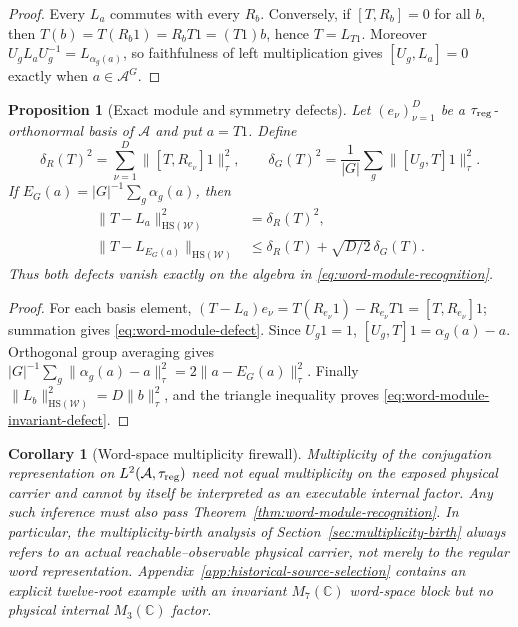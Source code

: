 \documentclass[11pt]{article}
\newtheorem{proposition}[theorem]{Proposition}
\newtheorem{corollary}[theorem]{Corollary}
\theoremstyle{definition}
\theoremstyle{remark}
\newcommand{\C}{\mathbb C}
\newcommand{\HS}{\mathrm{HS}}
\newcommand{\norm}[1]{\lVert#1\rVert}
\newcommand{\A}{\mathcal A}
\begin{document}
\begin{proof}
Every $L_a$ commutes with every $R_b$.  Conversely, if $[T,R_b]=0$ for all
$b$, then $T(b)=T(R_b1)=R_bT1=(T1)b$, hence $T=L_{T1}$.  Moreover
$U_gL_aU_g^{-1}=L_{\alpha_g(a)}$, so faithfulness of left multiplication gives
$[U_g,L_a]=0$ exactly when $a\in\A^G$.
\end{proof}

\begin{proposition}[Exact module and symmetry defects]
\label{prop:word-module-defect}
Let $(e_\nu)_{\nu=1}^D$ be a $\tau_{\rm reg}$-orthonormal basis of $\A$ and
put $a=T1$.  Define
\[
 \delta_R(T)^2=\sum_{\nu=1}^D\norm{[T,R_{e_\nu}]1}_{\tau}^2,
 \qquad
 \delta_G(T)^2=\frac1{|G|}\sum_g\norm{[U_g,T]1}_{\tau}^2.
\]
If $E_G(a)=|G|^{-1}\sum_g\alpha_g(a)$, then
\begin{align}
 \norm{T-L_a}_{\HS(\mathscr W)}^2&=\delta_R(T)^2,
 \label{eq:word-module-defect}\\
 \norm{T-L_{E_G(a)}}_{\HS(\mathscr W)}
 &\le \delta_R(T)+\sqrt{D/2}\,\delta_G(T).
 \label{eq:word-module-invariant-defect}
\end{align}
Thus both defects vanish exactly on the algebra in
\eqref{eq:word-module-recognition}.
\end{proposition}

\begin{proof}
For each basis element,
$(T-L_a)e_\nu=T(R_{e_\nu}1)-R_{e_\nu}T1=[T,R_{e_\nu}]1$; summation gives
\eqref{eq:word-module-defect}.  Since $U_g1=1$,
$[U_g,T]1=\alpha_g(a)-a$.  Orthogonal group averaging gives
$|G|^{-1}\sum_g\norm{\alpha_g(a)-a}_\tau^2=2\norm{a-E_G(a)}_\tau^2$.
Finally $\norm{L_b}_{\HS(\mathscr W)}^2=D\norm b_\tau^2$, and the triangle
inequality proves \eqref{eq:word-module-invariant-defect}.
\end{proof}

\begin{corollary}[Word-space multiplicity firewall]
\label{cor:word-multiplicity-firewall}
Multiplicity of the conjugation representation on $L^2(\A,\tau_{\rm reg})$
need not equal multiplicity on the exposed physical carrier and cannot by
itself be interpreted as an executable internal factor.  Any such inference
must also pass Theorem~\ref{thm:word-module-recognition}.  In particular, the
multiplicity-birth analysis of Section~\ref{sec:multiplicity-birth} always
refers to an actual reachable--observable physical carrier, not merely to the
regular word representation.  Appendix~\ref{app:historical-source-selection}
contains an explicit twelve-root example with an invariant $M_7(\C)$ word-space
block but no physical internal $M_3(\C)$ factor.
\end{corollary}
\end{document}
